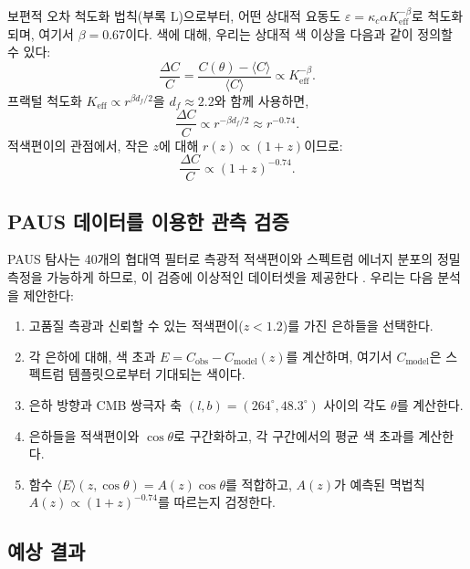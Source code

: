 \documentclass[11pt,a4paper]{article}
\newcommand{\Keff}{K_{\mathrm{eff}}}
\begin{document}
	보편적 오차 척도화 법칙(부록 L)으로부터, 어떤 상대적 요동도 \(\varepsilon = \kappa_c \alpha \Keff^{-\beta}\)로 척도화되며, 여기서 \(\beta = 0.67\)이다. 색에 대해, 우리는 상대적 색 이상을 다음과 같이 정의할 수 있다:
	\begin{equation}
		\frac{\Delta C}{C} = \frac{C(\theta) - \langle C \rangle}{\langle C \rangle} \propto \Keff^{-\beta}.
	\end{equation}
	프랙털 척도화 \(\Keff \propto r^{\beta d_f/2}\)을 \(d_f \approx 2.2\)와 함께 사용하면,
	\begin{equation}
		\frac{\Delta C}{C} \propto r^{-\beta d_f/2} \approx r^{-0.74}.
	\end{equation}
	적색편이의 관점에서, 작은 \(z\)에 대해 \(r(z) \propto (1+z)\)이므로:
	\begin{equation}
		\frac{\Delta C}{C} \propto (1+z)^{-0.74}.
	\end{equation}
	
	\subsection{PAUS 데이터를 이용한 관측 검증}
	
	PAUS 탐사는 40개의 협대역 필터로 측광적 적색편이와 스펙트럼 에너지 분포의 정밀 측정을 가능하게 하므로, 이 검증에 이상적인 데이터셋을 제공한다 \cite{Alarcon2019}. 우리는 다음 분석을 제안한다:
	
	\begin{enumerate}
		\item 고품질 측광과 신뢰할 수 있는 적색편이(\(z < 1.2\))를 가진 은하들을 선택한다.
		\item 각 은하에 대해, 색 초과 \(E = C_{\mathrm{obs}} - C_{\mathrm{model}}(z)\)를 계산하며, 여기서 \(C_{\mathrm{model}}\)은 스펙트럼 템플릿으로부터 기대되는 색이다.
		\item 은하 방향과 CMB 쌍극자 축 \((l,b) = (264^\circ, 48.3^\circ)\) 사이의 각도 \(\theta\)를 계산한다.
		\item 은하들을 적색편이와 \(\cos\theta\)로 구간화하고, 각 구간에서의 평균 색 초과를 계산한다.
		\item 함수 \(\langle E \rangle(z,\cos\theta) = A(z) \cos\theta\)를 적합하고, \(A(z)\)가 예측된 멱법칙 \(A(z) \propto (1+z)^{-0.74}\)를 따르는지 검정한다.
	\end{enumerate}
	
	\subsection{예상 결과}
	
\end{document}
